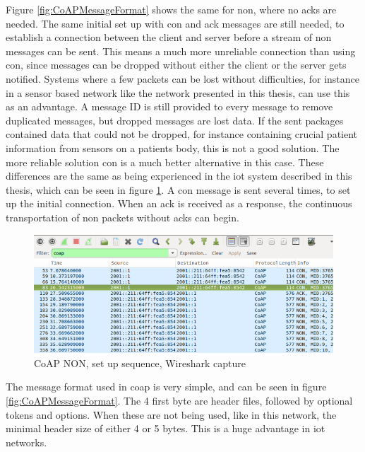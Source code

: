 \noindent Figure \ref{fig:CoAPMessageFormat} shows the same for \gls{non}, where no \glspl{ack} are needed. The same initial set up with \gls{con} and \gls{ack} messages are still needed, to establish a connection between the client and server before a stream of \gls{non} messages can be sent. This means a much more unreliable connection than using \gls{con}, since messages can be dropped without either the client or the server gets notified. Systems where a few packets can be lost without difficulties, for instance in a sensor based network like the network presented in this thesis, can use this as an advantage. A message ID is still provided to every message to remove duplicated messages, but dropped messages are lost data. If the sent packages contained data that could not be dropped, for instance containing crucial patient information from sensors on a patients body, this is not a good solution. The more reliable solution \gls{con} is a much better alternative in this case. These differences are the same as being experienced in the \gls{iot} system described in this thesis, which can be seen in figure \ref{fig:CoAPNONwiresharkSetUp}. A \gls{con} message is sent several times, to set up the initial connection. When an \gls{ack} is received as a response, the continuous transportation of \gls{non} packets without \glspl{ack} can begin.  

\begin{figure}[ht]
    \centering
    \includegraphics[width=1.0\textwidth]{coapCONwiresharksetUpSequence.png}    
    \caption{CoAP NON, set up sequence, Wireshark capture}
    \label{fig:CoAPNONwiresharkSetUp}
\end{figure}


\noindent The message format used in \gls{coap} is very simple, and can be seen in figure \ref{fig:CoAPMessageFormat}. The 4 first byte are header files, followed by optional tokens and options. When these are not being used, like in this network, the minimal header size of either 4 or 5 bytes. This is a huge advantage in \gls{iot} networks.

